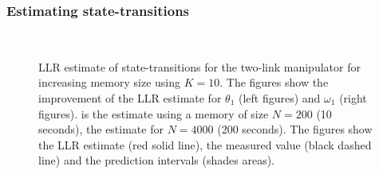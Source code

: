 \subsubsection{Estimating state-transitions}\label{sec:LLR-2link_statetransitions}
\begin{figure}[htbp]
	\centering
	\\
	\caption[\ac{LLR} estimate of the two-link manipulator]{\ac{LLR} estimate of state-transitions for the two-link manipulator for increasing memory size using $K=10$. The figures show the improvement of the \ac{LLR} estimate for $\theta_1$ (left figures) and $\omega_1$ (right figures).  is the estimate using a memory of size $N=200$ (10 seconds),  the estimate for $N=4000$ (200 seconds). The figures show the \ac{LLR} estimate (red solid line), the measured value (black dashed line) and the prediction intervals (shades areas).}
	\label{fig:LLR-RobotarmIncr}
\end{figure}
